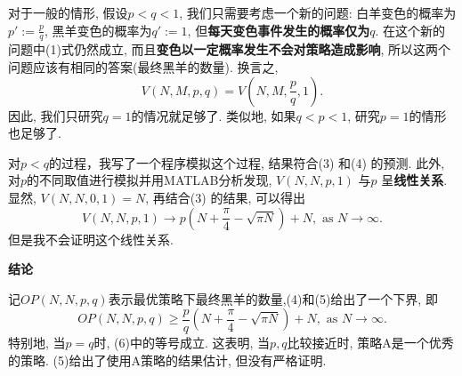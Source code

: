 \documentclass[11pt]{article}
\begin{document}
对于一般的情形, 假设$p < q < 1$, 我们只需要考虑一个新的问题: 白羊变色的概率为$p' := \frac{p}{q}$, 黑羊变色的概率为$q' := 1$, 但\textbf{每天变色事件发生的概率仅为}$q$. 在这个新的问题中(1)式仍然成立, 而且\textbf{变色以一定概率发生不会对策略造成影响}, 所以这两个问题应该有相同的答案(最终黑羊的数量). 换言之,
\begin{equation}
V(N,M,p,q) = V(N,M,\frac{p}{q},1).
\end{equation}
因此, 我们只研究$q = 1$的情况就足够了.
类似地, 如果$q < p < 1$, 研究$p = 1$的情形也足够了.

对$p < q$的过程，我写了一个\cpluspluslogo 程序模拟这个过程, 结果符合(3) 和(4) 的预测. 此外, 对$p$的不同取值进行模拟并用MATLAB分析发现, $V(N,N,p,1)$ 与$p$ 呈\textbf{线性关系}. 显然, $V(N,N,0,1) = N$, 再结合(3) 的结果, 可以得出
\begin{equation}
V(N,N,p,1) \to p(N + \frac{\pi}{4} - \sqrt{\pi N}) + N, \text{ as } N \to \infty.
\end{equation}
但是我不会证明这个线性关系.
\vspace{0.5cm}
\begin{tcolorbox}
\textbf{结论}

记$OP(N,N,p,q)$表示最优策略下最终黑羊的数量,(4)和(5)给出了一个下界, 即
\begin{equation}
OP(N,N,p,q) \geq \frac{p}{q}(N + \frac{\pi}{4} - \sqrt{\pi N}) + N, \text{ as } N \to \infty.
\end{equation}
特别地, 当$p = q$时, (6)中的等号成立.
这表明, 当$p,q$比较接近时, 策略A是一个优秀的策略. (5)给出了使用A策略的结果估计, 但没有严格证明.
\end{tcolorbox}
\end{document}

